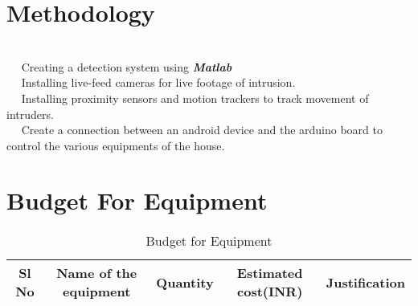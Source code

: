 \documentclass[margin, centered]{res}
\begin{document}
\begin{resume}
\section{Methodology}
\hspace{5mm} \\
~\textbullet~ Creating a detection system using \textbf{\textit{Matlab}}\\
~\textbullet~ Installing live-feed cameras for live footage of intrusion.\\
~\textbullet~ Installing proximity sensors and motion trackers to track movement of intruders.\\
~\textbullet~ Create a connection between an android device and the arduino board to control the various equipments of the house.


\section{Budget For Equipment}
\begin{table}[ht]
\caption{Budget for Equipment}
\begin{tabular}{|c |c |c |c |c|}
\hline \hline
Sl No & Name of the equipment & Quantity & Estimated cost(INR) & Justification\\
\hline


\end{tabular}
\end{table}
\end{resume}
\end{document}
